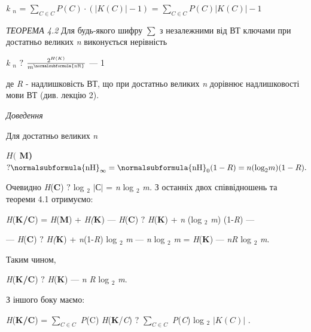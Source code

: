 \bigskip

{\centering
\textit{k} ${{}_{{n}}}$ =   ${\underset{{C\in C}}{\sum }{P(C)\cdot (|K(C)|-1)}}$
=   ${\underset{{C\in C}}{\sum }{P(C)|K(C)|-1}}$
\par}


\bigskip

\textit{ТЕОРЕМА 4.2}\textit{  }Для будь-якого шифру   ${\sum {}}$ з незалежними
від ВТ ключами  при достатньо великих \textit{n} виконується  нерівність 

{\centering
\textit{k} ${{}_{{n}}}$   ${?}$  
${\frac{2^{{H(K)}}}{m^{{\normalsubformula{\text{nR}}}}}}$ ---  1 
\par}


\bigskip

 де  \textit{R}  {}-  надлишковість  ВТ, що при достатньо великих \textit{n}
дорівнює надлишковості мови ВТ (див. лекцію 2).

{\itshape
Доведення }

 Для  достатньо великих  \textit{n} 

{\centering\bfseries
 ${H(}$ M) ${?\normalsubformula{\text{nH}}_{{\infty
}}=\normalsubformula{\text{nH}}_{{0}}(1-R)=n(\text{log}_{{2}}m)(1-R)\text{.}}$
\par}

Очевидно \textit{ }\textit{H}(\textbf{C})  ${?}$  log ${{}_{{2}}}$
${|\text{С}|}$ =  \textit{n} log ${{}_{{2}}}$ \textit{m}\textit{.}  З останніх
двох співвідношень та теореми 4.1  отримуємо:

{\centering
\textit{H}(\textbf{K}\textbf{/}\textbf{C}) = \textit{H}(\textbf{M}) +
\textit{H}\textit{(}\textbf{K}) --- \textit{H}(\textbf{C})  ${?}$ 
\textit{H}(\textbf{K}) + \textit{n} (log ${{}_{{2}}}$ \textit{m})
(1-\textit{R}) ---
\par}

{\centering
--- \textit{H}(\textbf{C})  ${?}$ \textit{H}\textit{(}\textbf{K}) +
\textit{n}(1-\textit{R}) log ${{}_{{2}}}$ \textit{m} --- \textit{n} log
${{}_{{2}}}$ \textit{m} = \textit{H}(\textbf{K}) --- \textit{nR} log ${{}_{{2}}}$
\textit{m}.
\par}

Таким чином, 

{\centering
\textit{H}(\textbf{K}\textbf{/}\textbf{C}) ${?}$\textit{ }\textit{H}(\textbf{K})
--- \textit{n}\textit{ }\textit{R} log ${{}_{{2}}}$ \textit{m}.
\par}

З іншого боку маємо:

{\centering
\textit{H}(\textbf{K}\textbf{/}\textbf{C}) =   ${\underset{{C\in C}}{\sum }{}}$
\textit{P}(C) \textit{H}(\textbf{K}/\textit{C})  ${?}$  ${\underset{{C\in
C}}{\sum }{}}$ \textit{P}(\textit{C}) log ${{}_{{2}}}$ ${|K(C)|}$ .
\par}

